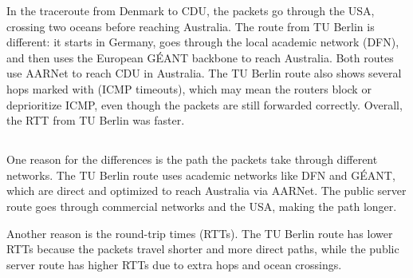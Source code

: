 \documentclass{article}
\begin{document}
    In the traceroute from Denmark to CDU, the packets go through the USA, crossing two oceans before reaching Australia.
    The route from TU Berlin is different: it starts in Germany, goes through the local academic network (DFN), and then uses the European GÉANT backbone to reach Australia.
    Both routes use AARNet to reach CDU in Australia.
    The TU Berlin route also shows several hops marked with \glqq * \grqq{} (ICMP timeouts), which may mean the routers block or deprioritize ICMP, even though the packets are still forwarded correctly.
    Overall, the RTT from TU Berlin was faster.
    
    \subsection{}

    One reason for the differences is the path the packets take through different networks. The TU Berlin route uses academic networks like DFN and GÉANT, which are direct and optimized to reach Australia via AARNet. The public server route goes through commercial networks and the USA, making the path longer.
    
    Another reason is the round-trip times (RTTs). The TU Berlin route has lower RTTs because the packets travel shorter and more direct paths, while the public server route has higher RTTs due to extra hops and ocean crossings.
\end{document}
